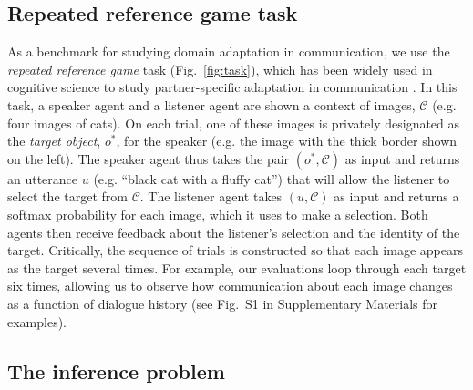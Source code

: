 \documentclass[11pt,a4paper]{article}
\begin{document}
\subsection{Repeated reference game task}
\label{sec:task}

As a benchmark for studying domain adaptation in communication, we use the \emph{repeated reference game} task (Fig.\ \ref{fig:task}), which has been widely used in cognitive science to study partner-specific adaptation in communication \cite{KraussWeinheimer64_ReferencePhrases,ClarkWilkesGibbs86_ReferringCollaborative,WilkesGibbsClark92_CoordinatingBeliefs}.
In this task, a speaker agent and a listener agent are shown a context of images, $\mathcal{C}$ (e.g. four images of cats). %
On each trial, one of these images is privately designated as the \emph{target object}, $o^*$, for the speaker (e.g. the image with the thick border shown on the left).
The speaker agent thus takes the pair $(o^*, \mathcal{C})$ as input and returns an utterance $u$ (e.g. ``black cat with a fluffy cat'') that will allow the listener to select the target from $\mathcal{C}$.
The listener agent takes $(u, \mathcal{C})$ as input and returns a softmax probability for each image, which it uses to make a selection.
Both agents then receive feedback about the listener's selection and the identity of the target. 
Critically, the sequence of trials is constructed so that each image appears as the target several times.
For example, our evaluations loop through each target six times, allowing us to observe how communication about each image changes as a function of dialogue history (see Fig.\ S1 in Supplementary Materials for examples).


\subsection{The inference problem}
\label{sec:bayes}
\end{document}
